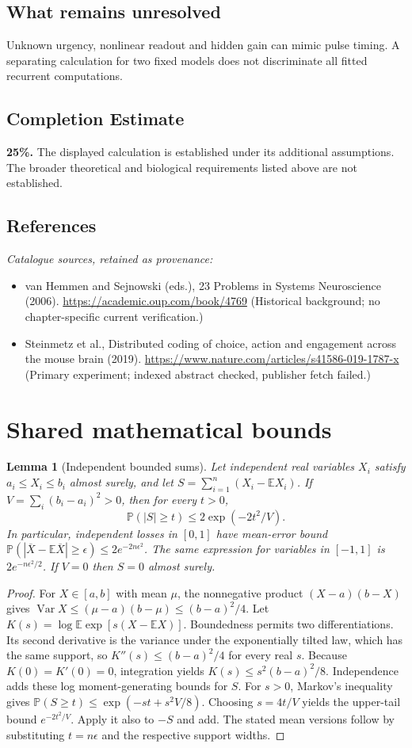 \documentclass[11pt]{article}
\newcommand{\E}{\mathbb E}
\newcommand{\Prob}{\mathbb P}
\DeclareMathOperator{\Var}{Var}
\providecommand{\E}{\mathbb E}
\providecommand{\Prob}{\mathbb P}
\providecommand{\Var}{\operatorname{Var}}
\newtheorem{sharedlemma}{Lemma}[section]
\begin{document}
\subsection{What remains unresolved}
Unknown urgency, nonlinear readout and hidden gain can mimic pulse timing. A separating calculation for two fixed models does not discriminate all fitted recurrent computations.
\subsection{Completion Estimate}
\textbf{25\%.} The displayed calculation is established under its additional assumptions. The broader theoretical and biological requirements listed above are not established.
\subsection{References}
\noindent\emph{Catalogue sources, retained as provenance:}
\begin{itemize}
\item van Hemmen and Sejnowski (eds.), 23 Problems in Systems Neuroscience (2006). \url{https://academic.oup.com/book/4769} (Historical background; no chapter-specific current verification.)
\item Steinmetz et al., Distributed coding of choice, action and engagement across the mouse brain (2019). \url{https://www.nature.com/articles/s41586-019-1787-x} (Primary experiment; indexed abstract checked, publisher fetch failed.)
\end{itemize}
\clearpage


\appendix
\section{Shared mathematical bounds}\label{app:bounds}
\begin{sharedlemma}[Independent bounded sums]\label{lem:bounded}
Let independent real variables $X_i$ satisfy $a_i\leq X_i\leq b_i$ almost surely,
and let $S=\sum_{i=1}^n(X_i-\E X_i)$. If
$V=\sum_i(b_i-a_i)^2>0$, then for every $t>0$,
\[
 \Prob(|S|\geq t)\leq 2\exp(-2t^2/V).
\]
In particular, independent losses in $[0,1]$ have mean-error bound
$\Prob(|\overline X-\E\overline X|\geq\epsilon)
\leq2e^{-2n\epsilon^2}$. The same expression for variables in $[-1,1]$
is $2e^{-n\epsilon^2/2}$. If $V=0$ then $S=0$ almost surely.
\end{sharedlemma}
\begin{proof}
For $X\in[a,b]$ with mean $\mu$, the nonnegative product
$(X-a)(b-X)$ gives
$\Var X\leq(\mu-a)(b-\mu)\leq(b-a)^2/4$.
Let $K(s)=\log\E\exp[s(X-\E X)]$.
Boundedness permits two differentiations. Its second derivative is the variance
under the exponentially tilted law, which has the same support, so
$K''(s)\leq(b-a)^2/4$ for every real $s$.
Because $K(0)=K'(0)=0$, integration yields
$K(s)\leq s^2(b-a)^2/8$.
Independence adds these log moment-generating bounds for $S$.
For $s>0$, Markov's inequality gives
$\Prob(S\geq t)\leq\exp(-st+s^2V/8)$.
Choosing $s=4t/V$ yields the upper-tail bound $e^{-2t^2/V}$.
Apply it also to $-S$ and add. The stated mean versions follow by substituting
$t=n\epsilon$ and the respective support widths.
\end{proof}
\end{document}
